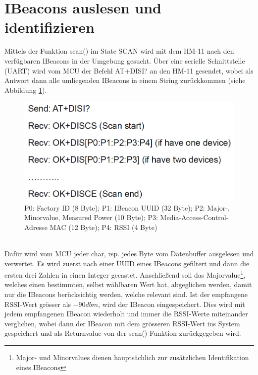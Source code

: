 \section{IBeacons auslesen und identifizieren}
Mittels der Funktion scan() im State SCAN wird mit dem HM-11 nach den verfügbaren IBeacons in der Umgebung gesucht. Über eine serielle Schnittstelle (UART) wird vom MCU der Befehl AT+DISI? an den HM-11 gesendet, wobei als Antwort dann alle umliegenden IBeacons in einem String zurückkommen (siehe Abbildung \ref{fig:disiCommand}).\\
\begin{figure}[h]
\centering
\includegraphics[scale=0.7]{Bilder/disi_command.PNG} 
\caption[Rückgabe des AT+DISI? Befehls]{P0: Factory ID (8 Byte); P1: IBeacon UUID (32 Byte); P2: Major-, Minorvalue, Measured Power (10 Byte); P3: Media-Access-Control-Adresse MAC (12 Byte); P4: RSSI (4 Byte) \cite{hm11Datasheet}}
\label{fig:disiCommand}
\end{figure}\\
Dafür wird vom MCU jeder char, rsp. jedes Byte vom Datenbuffer ausgelesen und verwertet. Es wird zuerst nach einer UUID eines IBeacons gefiltert und dann die ersten drei Zahlen in einen Integer gecastet. Anschließend soll das Majorvalue\footnote{Major- und Minorvalues dienen hauptsächlich zur zusätzlichen Identifikation eines IBeacons}, welches einen bestimmten, selbst wählbaren Wert hat, abgeglichen werden, damit nur die IBeacons berücksichtig werden, welche relevant sind. Ist der empfangene RSSI-Wert grösser als $-90dbm$, wird der IBeacon eingespeichert. Dies wird mit jedem empfangenen IBeacon wiederholt und immer die RSSI-Werte miteinander verglichen, wobei dann der IBeacon mit dem grösseren RSSI-Wert ins System gespeichert und als Returnvalue von der scan() Funktion zurückgegeben wird.

